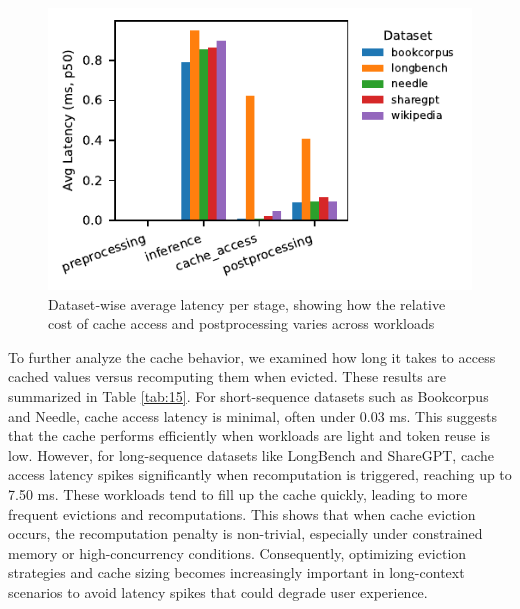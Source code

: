 \documentclass[sigconf,nonacm]{acmart}
\begin{document}
 \begin{figure}[H]
    \centering
   \includegraphics[scale=0.9]{figure16.pdf}
    \vspace{-1.0em}
    \caption{Dataset‐wise average latency per stage, showing how the relative cost of cache access and postprocessing varies across workloads }
    \label{figure16}
\end{figure}
\vspace{-1.0em}
To further analyze the cache behavior, we examined how long it takes to access cached values versus recomputing them when evicted. These results are summarized in Table \ref{tab:15}. For short-sequence datasets such as Bookcorpus and Needle, cache access latency is minimal, often under 0.03 ms. This suggests that the cache performs efficiently when workloads are light and token reuse is low. However, for long-sequence datasets like LongBench and ShareGPT, cache access latency spikes significantly when recomputation is triggered, reaching up to 7.50 ms. These workloads tend to fill up the cache quickly, leading to more frequent evictions and recomputations. This shows that when cache eviction occurs, the recomputation penalty is non-trivial, especially under constrained memory or high-concurrency conditions. Consequently, optimizing eviction strategies and cache sizing becomes increasingly important in long-context scenarios to avoid latency spikes that could degrade user experience.
\end{document}
